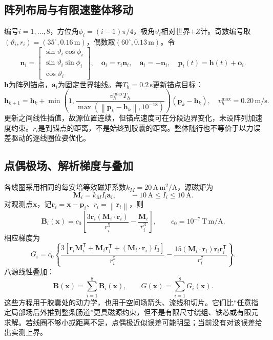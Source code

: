 \documentclass[UTF8,a4paper,zihao=5,fontset=windows]{ctexart}
\newcommand{\vect}[1]{\bm{#1}}
\newcommand{\norm}[1]{\left\lVert#1\right\rVert}
\newcommand{\unit}[1]{\,\mathrm{#1}}
\begin{document}
\subsection{阵列布局与有限速整体移动}
编号$i=1,\ldots,8$，方位角$\phi_i=(i-1)\pi/4$，极角$\vartheta_i$相对世界$+Z$计。奇数编号取$(\vartheta_i,r_i)=(35^\circ,0.16\unit m)$，偶数取$(60^\circ,0.13\unit m)$。令
\begin{equation}
\vect n_i=\begin{bmatrix}\sin\vartheta_i\cos\phi_i\\\sin\vartheta_i\sin\phi_i\\\cos\vartheta_i\end{bmatrix},\quad
\vect o_i=r_i\vect n_i,\quad\vect a_i=-\vect n_i,\quad\vect p_i(t)=\vect h(t)+\vect o_i.
\label{eq:layout}
\end{equation}
$\vect h$为阵列锚点，$\vect a_i$为固定世界轴线。每$T_h=0.2\unit s$更新锚点目标：
\begin{equation}
\vect h_{k+1}=\vect h_k+
\min\left(1,\frac{v_h^{\max}T_h}{\max(\norm{\vect p_k-\vect h_k},10^{-18})}\right)(\vect p_k-\vect h_k),\quad
v_h^{\max}=0.20\unit{m/s}.
\label{eq:anchor}
\end{equation}
更新之间线性插值，故源位置连续，但锚点速度可在分段边界变化，未设阵列加速度约束。$r_i$是到锚点的距离，不是始终到胶囊的距离。整体随行也不等价于以力误差驱动的逐线圈位姿优化。

\subsection{点偶极场、解析梯度与叠加}
各线圈采用相同的每安培等效磁矩系数$k_M=20\unit{A\,m^2/A}$，源磁矩为
\begin{equation}
\vect M_i=k_M I_i\vect a_i,\qquad -10\unit A\le I_i\le10\unit A.
\label{eq:source_moment}
\end{equation}
对观测点$\vect x$，记$\vect r_i=\vect x-\vect p_i$、$r_i=\norm{\vect r_i}$，则
\begin{equation}
\vect B_i(\vect x)=c_0\left[\frac{3\vect r_i(\vect M_i\cdot\vect r_i)}{r_i^5}-\frac{\vect M_i}{r_i^3}\right],\qquad
c_0=10^{-7}\unit{T\,m/A}.
\label{eq:dipole_field}
\end{equation}
相应梯度为
\begin{equation}
G_i=c_0\left\{\frac{3[\vect r_i\vect M_i^{\mathsf T}+\vect M_i\vect r_i^{\mathsf T}+(\vect M_i\cdot\vect r_i)I_3]}{r_i^5}
-\frac{15(\vect M_i\cdot\vect r_i)\vect r_i\vect r_i^{\mathsf T}}{r_i^7}\right\}.
\label{eq:dipole_gradient}
\end{equation}
八源线性叠加：
\begin{equation}
\vect B(\vect x)=\sum_{i=1}^8\vect B_i(\vect x),\qquad G(\vect x)=\sum_{i=1}^8G_i(\vect x).
\label{eq:superposition}
\end{equation}
这些方程用于胶囊处的动力学，也用于空间场箭头、流线和切片。它们比“任意指定局部场后外推到整条肠道”更具磁源约束，但不是有限尺寸绕组、铁芯或有限元求解。若线圈不够小或距离不足，点偶极近似误差可能明显；当前没有对该误差给出实测上界。
\end{document}
